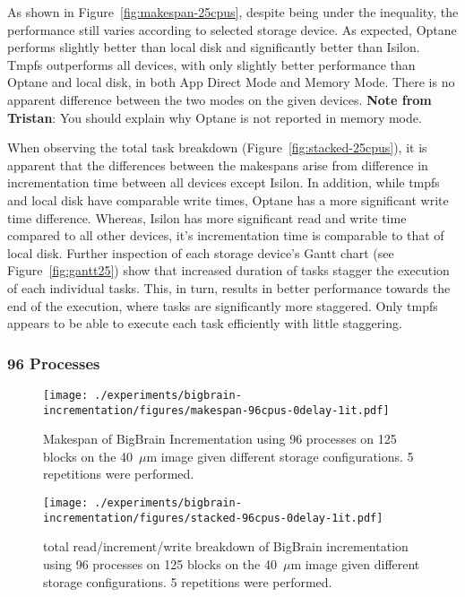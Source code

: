 \documentclass[conference]{IEEEtran}
\newcommand{\bigbrain}{BigBrain }
\newcommand{\tristan}[1]{\color{orange}\textbf{Note from Tristan}:
      #1 \color{black}}
\begin{document}
As shown in Figure~\ref{fig:makespan-25cpus}, despite being under the inequality, the
performance still varies according to selected storage device. As expected, Optane performs
slightly better than local disk and significantly better than Isilon. Tmpfs outperforms all
devices, with only slightly better performance than Optane and local disk, in both App Direct Mode and Memory Mode.
There is no apparent difference between the two modes on the given devices.
\tristan{You should explain why Optane is not reported in memory mode.}

When observing the total task breakdown (Figure~\ref{fig:stacked-25cpus}), it is
apparent that the differences between the makespans arise from difference in incrementation
time between all devices except Isilon. In addition, while tmpfs and local disk have comparable write times, Optane
has a more significant write time difference. Whereas, Isilon has more significant read and
write time compared to all other devices, it's incrementation time is comparable to that
of local disk. Further inspection of each storage device's Gantt chart (see Figure~\ref{fig:gantt25})
show that increased duration of tasks stagger the execution of each individual tasks. This, in turn,
results in better performance towards the end of the execution, where tasks are significantly more staggered.
Only tmpfs appears to be able to execute each task efficiently with little staggering.
\subsubsection{96 Processes}
\begin{figure}
    \texttt{[image: ./experiments/bigbrain-incrementation/figures/makespan-96cpus-0delay-1it.pdf]}
    \captionsetup{width=\columnwidth}
    \caption{Makespan of \bigbrain Incrementation using 96 processes on 125 blocks on the 40~$\mu$m image given different storage configurations. 5 repetitions were performed.}\label{fig:makespan-96cpus}
\end{figure}
\begin{figure}
    \texttt{[image: ./experiments/bigbrain-incrementation/figures/stacked-96cpus-0delay-1it.pdf]}
    \captionsetup{width=\columnwidth}
    \caption{total read/increment/write breakdown of \bigbrain incrementation using 96 processes on 125 blocks on the 40~$\mu$m image given different storage configurations. 5 repetitions were performed.}\label{fig:stacked-96cpus}
\end{figure}
\end{document}
